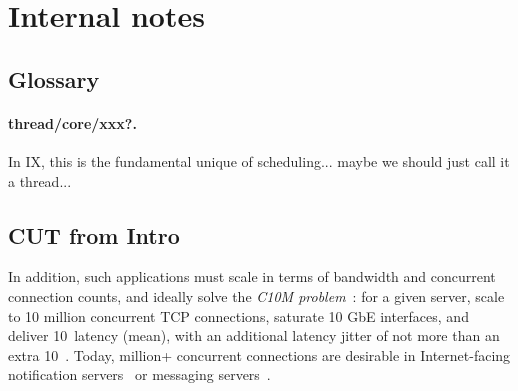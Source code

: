 
\section{Internal notes}


\subsection{Glossary}

\paragraph{thread/core/xxx?.}  In IX, this is the fundamental unique of scheduling... maybe we should just call it a thread...



\subsection{ CUT from Intro}



In addition, such applications must scale in terms of bandwidth and
concurrent connection counts, and ideally solve the \emph{C10M
  problem}~\cite{theC10Mproblem}: for a given server, scale to 10
million concurrent TCP connections, saturate 10 GbE interfaces, and
deliver 10~\microsecond latency (mean), with an additional latency
jitter of not more than an extra 10~\microsecond.  Today, million+
concurrent connections are desirable in Internet-facing notification
servers~\cite{DBLP:conf/sosp/AdyaCMP11} or messaging
servers~\cite{whatsapp-2mil}. 



